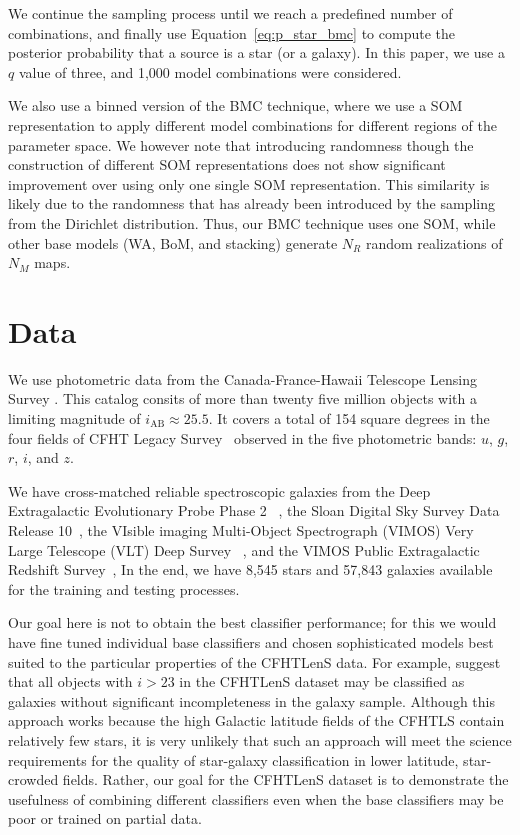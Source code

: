 \documentclass[useAMS,usenatbib]{mn2e}
\begin{document}
We continue the sampling process until
we reach a predefined number of combinations,
and finally use Equation~\ref{eq:p_star_bmc} to compute
the posterior probability that a source is a star (or a galaxy).
In this paper, we use a $q$ value of three,
and 1,000 model combinations were considered.


We also use a binned version of the BMC technique,
where we use a SOM representation
to apply different model combinations
for different regions of the parameter space.
We however note that introducing randomness
though the construction of different SOM representations
does not show significant
improvement over using only one single SOM representation.
This similarity is likely due to the randomness 
that has already been introduced by 
the sampling from the Dirichlet distribution.
Thus, our BMC technique uses one SOM,
while other base models (WA, BoM, and stacking)
generate $N_R$ random realizations of $N_M$ maps.


\section{Data}
  \label{section:data}

We use photometric data from
the Canada-France-Hawaii Telescope Lensing Survey
\cite[CFHTLenS\footnote{http://www.cfhtlens.org/};][]
{Heymans2012,Erben2013,Hildebrandt2012}.
This catalog consits of more than twenty five million objects
with a limiting magnitude of $i_{\text{AB}} \approx 25.5$. 
It covers a total of 154 square degrees
in the four fields of CFHT Legacy Survey~\citep[CFHTLS;][]{gwyn2012canada}
observed in the five photometric bands:
$u$, $g$, $r$, $i$, and $z$.

We have cross-matched reliable spectroscopic galaxies from
the Deep Extragalactic Evolutionary Probe Phase 2~
\citep[DEEP2;][]{Davis2003,Newman2013a},
the Sloan Digital Sky Survey Data Release 10~\citep[SDSS-DR10]{Ahn2014},
the VIsible imaging Multi-Object Spectrograph (VIMOS)
Very Large Telescope (VLT) Deep Survey~
\citep[VVDS;][]{LeFevre2005,Garilli2008}, and
the VIMOS Public Extragalactic Redshift Survey~\citep[VIPERS;][]{Garilli2014},
In the end, we have 8,545 stars and 57,843 galaxies available
for the training and testing processes.

Our goal here is not to obtain the best classifier
performance; for this we would have fine tuned individual base
classifiers and chosen sophisticated models best suited to the
particular properties of the CFHTLenS data.
For example, \cite{Hildebrandt2012} suggest that
all objects with $i > 23$ in the CFHTLenS dataset
may be classified as galaxies
without significant incompleteness in the galaxy sample.
Although this approach works because
the high Galactic latitude fields of the CFHTLS contain
relatively few stars,
it is very unlikely that such an approach
will meet the science requirements for the quality of
star-galaxy classification in lower latitude, star-crowded fields.
Rather, our goal for the CFHTLenS dataset
is to demonstrate the usefulness
of combining different classifiers even when
the base classifiers may be poor or trained on partial data.
\end{document}
